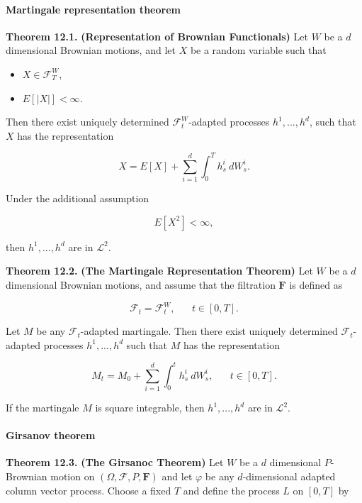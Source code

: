 \documentclass[
]{article}
\providecommand{\tightlist}{%
  \setlength{\itemsep}{0pt}\setlength{\parskip}{0pt}}
\begin{document}
\hypertarget{martingale-representation-theorem}{%
\paragraph{Martingale representation
theorem}\label{martingale-representation-theorem}}

\textbf{Theorem 12.1.} \textbf{(Representation of Brownian Functionals)}
Let \(W\) be a \(d\) dimensional Brownian motions, and let \(X\) be a
random variable such that

\begin{itemize}
\tightlist
\item
  \(X\in\mathcal{F}^W_T\),
\item
  \(E[\vert X\vert]<\infty\).
\end{itemize}

Then there exist uniquely determined \(\mathcal{F}^W_t\)-adapted
processes \(h^1,...,h^d\), such that \(X\) has the representation

\[
X=E[X]+\sum_{i=1}^d\int_0^Th^i_s\ dW_s^i.
\]

Under the additional assumption

\[
E[X^2]<\infty,
\]

then \(h^1,...,h^d\) are in \(\mathcal{L}^2\).

\textbf{Theorem 12.2.} \textbf{(The Martingale Representation Theorem)}
Let \(W\) be a \(d\) dimensional Brownian motions, and assume that the
filtration \(\mathbf{F}\) is defined as

\[
\mathcal{F}_t=\mathcal{F}^W_t,\hspace{20pt}t\in[0,T].
\]

Let \(M\) be any \(\mathcal{F}_t\)-adapted martingale. Then there exist
uniquely determined \(\mathcal{F}_t\)-adapted processes \(h^1,...,h^d\)
such that \(M\) has the representation

\[
M_t=M_0+\sum_{i=1}^d\int_0^t h_s^i\ dW_s^i,\hspace{20pt}t\in[0,T].
\]

If the martingale \(M\) is square integrable, then \(h^1,...,h^d\) are
in \(\mathcal{L}^2\).

\hypertarget{girsanov-theorem}{%
\paragraph{Girsanov theorem}\label{girsanov-theorem}}

\textbf{Theorem 12.3.} \textbf{(The Girsanoc Theorem)} Let \(W\) be a
\(d\) dimensional \(P\)-Brownian motion on
\((\Omega,\mathcal{F},P,\mathbf{F})\) and let \(\varphi\) be any
\(d\)-dimensional adapted column vector process. Choose a fixed \(T\)
and define the process \(L\) on \([0,T]\) by
\end{document}
